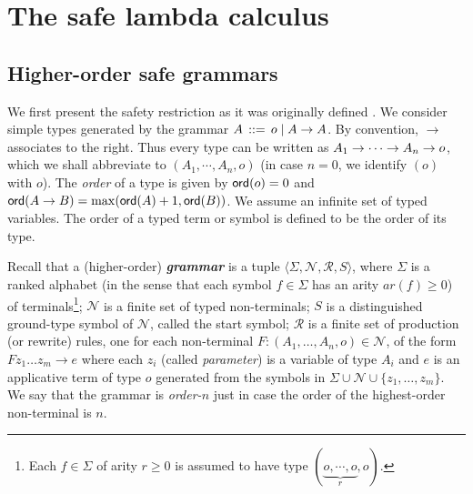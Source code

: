 \documentclass{llncs}
\newcommand\defname[1]{{\bf\em #1}\index{#1}}
\newcommand\union{\cup}
\begin{document}






\section{The safe lambda calculus}
\label{sec:safe}
\subsection*{Higher-order safe grammars}
We first present the safety restriction as it was originally defined
\cite{KNU02}. We consider simple types generated by the grammar $A \,
::= \, o \; | \; A \rightarrow A$. By convention, $\rightarrow$ associates
to the right. Thus every type can be written as $A_1 \rightarrow \cdots
\rightarrow A_n \rightarrow o$, which we shall abbreviate to $(A_1, \cdots,
A_n, o)$ (in case $n = 0$, we identify $(o)$ with $o$). The
\emph{order} of a type is given by ${\sf ord}(o) = 0$ and ${\sf ord}(A \rightarrow
  B) = \max({\sf ord}(A)+1, {\sf ord}(B))$. We assume an infinite set of typed
variables. The order of a typed term or symbol is defined to be the
order of its type.

Recall that a (higher-order) \defname{grammar} is a tuple $\langle
\Sigma, \mathcal{N}, \mathcal{R}, S \rangle$, where $\Sigma$ is a
ranked alphabet (in the sense that each symbol $f \in \Sigma$ has an
arity $\mathit{ar}(f) \geq 0$) of terminals\footnote{Each $f \in
  \Sigma$ of arity $r \geq 0$ is assumed to have type $(\underbrace{o,
    \cdots, o}_r, o)$.}; $\mathcal{N}$ is a finite set of typed
non-terminals; $S$ is a distinguished ground-type symbol of
$\mathcal{N}$, called the start symbol; $\mathcal{R}$ is a finite set
of production (or rewrite) rules, one for each non-terminal $F : (A_1,
\ldots, A_n, o) \in \mathcal{N}$, of the form $ F z_1 \ldots z_m
\rightarrow e$ where each $z_i$ (called \emph{parameter}) is a
variable of type $A_i$ and $e$ is an applicative term of type $o$
generated from the symbols in $\Sigma \union \mathcal{N} \union \{z_1,
\ldots, z_m \}$. We say that the grammar is \emph{order-$n$} just in
case the order of the highest-order non-terminal is $n$.
\end{document}
